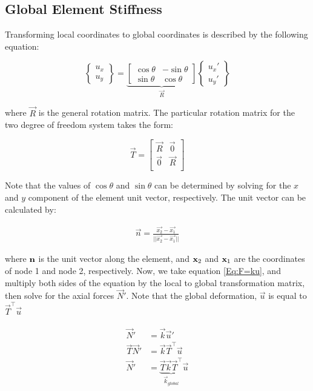 \subsection{Global Element Stiffness}

Transforming local coordinates to global coordinates is described by the following equation:

\begin{equation}
	\begin{Bmatrix}
		u_x\\ u_y
	\end{Bmatrix}
	=
	\underbrace{
		\begin{bmatrix}
			\cos\theta & -\sin\theta\\
			\sin\theta & \cos\theta
	\end{bmatrix}
	}_{\vec{R}}
	\begin{Bmatrix}
		u_x'\\ u_y'
	\end{Bmatrix}
\end{equation}

where $\vec{R}$ is the general rotation matrix. The particular rotation matrix for the two degree of freedom system takes the form:

\begin{equation}
	\vec{T}
	=	
	\begin{bmatrix}
		\vec{R} & \vec{0}\\
		\vec{0} & \vec{R}\\
	\end{bmatrix}
\end{equation}

Note that the values of $\cos\theta$ and $\sin\theta$ can be determined by solving for the $x$ and $y$ component of the element unit vector, respectively. The unit vector can be calculated by:

\begin{align}
	\vec{n} = \frac{\vec{x_2}-\vec{x_1}}{||\vec{x_2}-\vec{x_1}||}
\end{align}

where $\mathbf{n}$ is the unit vector along the element, and $\mathbf{x}_2$ and $\mathbf{x}_1$ are the coordinates of node 1 and node 2, respectively. Now, we take equation \ref{Eq:F=ku}, and multiply both sides of the equation by the local to global transformation matrix, then solve for the axial forces $\vec{N}'$. Note that the global deformation, $\vec{u}$ is equal to $\vec{T}^\intercal \vec{u}$

\begin{align}
	\vec{N}' &= \vec{k} \vec{u}'\\
	\vec{T} \vec{N}' &= \vec{k} \vec{T}^\intercal \vec{u}\\
	\vec{N}' &= \underbrace{\vec{T} \vec{k} \vec{T}^\intercal}_{\vec{k}_{global}} \vec{u}
\end{align}

